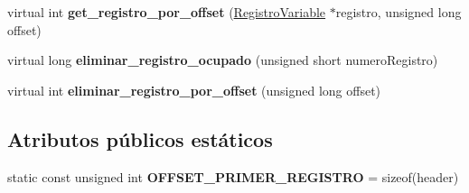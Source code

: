 \begin{DoxyCompactItemize}
\item 
\hypertarget{class_manejador_registros_variables_a4faa6a301c025de2a07be78d8c55eda6}{virtual int {\bfseries get\-\_\-registro\-\_\-por\-\_\-offset} (\hyperlink{class_registro_variable}{\-Registro\-Variable} $\ast$registro, unsigned long offset)}\label{class_manejador_registros_variables_a4faa6a301c025de2a07be78d8c55eda6}

\item 
\hypertarget{class_manejador_registros_variables_a4d3c4df4152c486db4a9d0f97deeec63}{virtual long {\bfseries eliminar\-\_\-registro\-\_\-ocupado} (unsigned short numero\-Registro)}\label{class_manejador_registros_variables_a4d3c4df4152c486db4a9d0f97deeec63}

\item 
\hypertarget{class_manejador_registros_variables_a0a9524fe7847a6699dd8fe7fe0ea49e9}{virtual int {\bfseries eliminar\-\_\-registro\-\_\-por\-\_\-offset} (unsigned long offset)}\label{class_manejador_registros_variables_a0a9524fe7847a6699dd8fe7fe0ea49e9}

\end{DoxyCompactItemize}
\subsection*{\-Atributos públicos estáticos}
\begin{DoxyCompactItemize}
\item 
\hypertarget{class_manejador_registros_variables_a560bf640b383a276ee3626e4679df291}{static const unsigned int {\bfseries \-O\-F\-F\-S\-E\-T\-\_\-\-P\-R\-I\-M\-E\-R\-\_\-\-R\-E\-G\-I\-S\-T\-R\-O} = sizeof(header)}\label{class_manejador_registros_variables_a560bf640b383a276ee3626e4679df291}

\end{DoxyCompactItemize}
